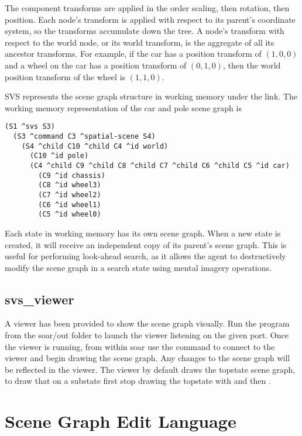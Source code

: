 The component transforms are applied in the order scaling, then rotation, then position.
Each node's transform is applied with respect to its parent's coordinate system, so the transforms accumulate down the tree.
A node's transform with respect to the world node, or its world transform, is the aggregate of all its ancestor transforms.
For example, if the car has a position transform of $(1,0,0)$ and a wheel on the car has a position transform of $(0,1,0)$, then the world position transform of the wheel is $(1,1,0)$.

SVS represents the scene graph structure in working memory under the  link.
The working memory representation of the car and pole scene graph is

\begin{verbatim}
(S1 ^svs S3)
  (S3 ^command C3 ^spatial-scene S4)
    (S4 ^child C10 ^child C4 ^id world)
      (C10 ^id pole)
      (C4 ^child C9 ^child C8 ^child C7 ^child C6 ^child C5 ^id car)
        (C9 ^id chassis)
        (C8 ^id wheel3)
        (C7 ^id wheel2)
        (C6 ^id wheel1)
        (C5 ^id wheel0)
\end{verbatim}

Each state in working memory has its own scene graph.
When a new state is created, it will receive an independent copy of its parent's scene graph.
This is useful for performing look-ahead search, as it allows the agent to destructively modify the scene graph in a search state using mental imagery operations.


\subsection{svs\_viewer}

A viewer has been provided to show the scene graph visually. 
Run the program  from the soar/out folder 
to launch the viewer listening on the given port. Once the viewer is running, 
from within soar use the command  to connect 
to the viewer and begin drawing the scene graph. Any changes to the scene graph
will be reflected in the viewer. The viewer by default draws the topstate scene graph, 
to draw that on a substate first stop drawing the topstate with 
 and then . 

\section{Scene Graph Edit Language}

